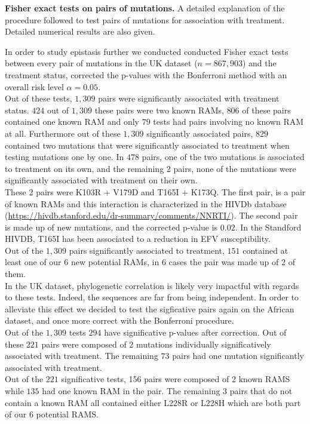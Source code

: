 \documentclass[
  11pt,
  twoside,
  BCOR=10mm,
  listof=totoc]{scrbook}
\begin{document}
\textbf{Fisher exact tests on pairs of mutations.} A detailed explanation of the procedure followed to test pairs of mutations for association with treatment. Detailed numerical results are also given.

In order to study epistasis further we conducted conducted Fisher exact tests between every pair of mutations in the UK dataset (\(n=867,903\)) and the treatment status, corrected the p-values with the Bonferroni method with an overall risk level \(\alpha=0.05\).\\
Out of these tests, \(1,309\) pairs were significantly associated with treatment status. \(424\) out of \(1,309\) these pairs were two known RAMs, \(806\) of these pairs contained one known RAM and only \(79\) tests had pairs involving no known RAM at all. Furthermore out of these \(1,309\) significantly associated pairs, \(829\) contained two mutations that were significantly associated to treatment when testing mutations one by one. In \(478\) pairs, one of the two mutations is associated to treatment on its own, and the remaining 2 pairs, none of the mutations were significantly associated with treatment on their own.\\
These 2 pairs were K103R + V179D and T165I + K173Q. The first pair, is a pair of known RAMs and this interaction is characterized in the HIVDb database (\url{https://hivdb.stanford.edu/dr-summary/comments/NNRTI/}). The second pair is made up of new mutations, and the corrected p-value is \(0.02\). In the Standford HIVDB, T165I has been associated to a reduction in EFV susceptibility.\\
Out of the \(1,309\) pairs significantly associated to treatment, \(151\) contained at least one of our 6 new potential RAMs, in \(6\) cases the pair was made up of 2 of them.\\
In the UK dataset, phylogenetic correlation is likely very impactful with regards to these tests. Indeed, the sequences are far from being independent. In order to alleviate this effect we decided to test the sigficative pairs again on the African dataset, and once more correct with the Bonferroni procedure.\\
Out of the \(1,309\) tests \(294\) have significative p-values after correction. Out of these \(221\) pairs were composed of 2 mutations individually significatively associated with treatment. The remaining \(73\) pairs had one mutation significantly associated with treatment.\\
Out of the \(221\) significative tests, 156 pairs were composed of 2 known RAMS while \(135\) had one known RAM in the pair. The remaining 3 pairs that do not contain a known RAM all contained either L228R or L228H which are both part of our 6 potential RAMS.
\end{document}
